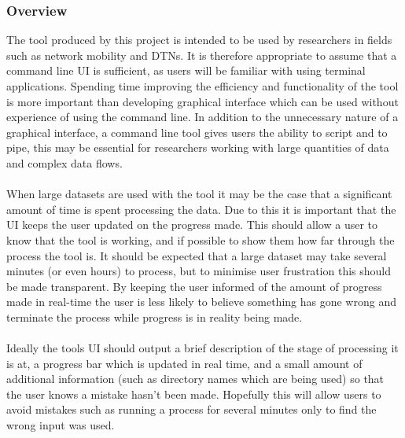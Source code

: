 \subsubsection{Overview}
The tool produced by this project is intended to be used by researchers in fields such as network mobility and DTNs. It is therefore appropriate to assume that a command line UI is sufficient, as users will be familiar with using terminal applications. Spending time improving the efficiency and functionality of the tool is more important than developing graphical interface which can be used without experience of using the command line. In addition to the unnecessary nature of a graphical interface, a command line tool gives users the ability to script and to pipe, this may be essential for researchers working with large quantities of data and complex data flows.\\\\
When large datasets are used with the tool it may be the case that a significant amount of time is spent processing the data. Due to this it is important that the UI keeps the user updated on the progress made. This should allow a user to know that the tool is working, and if possible to show them how far through the process the tool is. It should be expected that a large dataset may take several minutes (or even hours) to process, but to minimise user frustration this should be made transparent. By keeping the user informed of the amount of progress made in real-time the user is less likely to believe something has gone wrong and terminate the process while progress is in reality being made.\\\\
Ideally the tools UI should output a brief description of the stage of processing it is at, a progress bar which is updated in real time, and a small amount of additional information (such as directory names which are being used) so that the user knows a mistake hasn't been made. Hopefully this will allow users to avoid mistakes such as running a process for several minutes only to find the wrong input was used.\\\\
